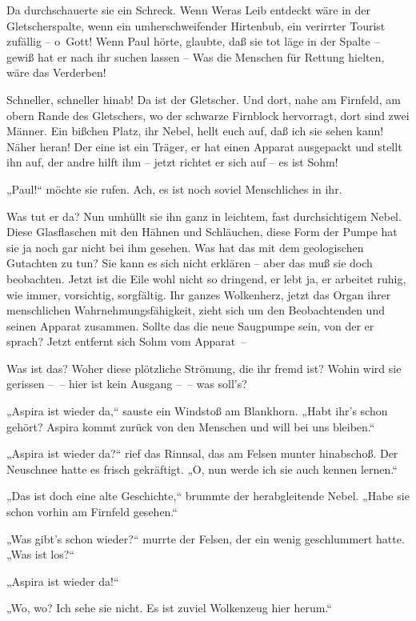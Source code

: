 Da durchschauerte sie ein Schreck. Wenn Weras Leib entdeckt wäre in
der Gletscherspalte, wenn ein umherschweifender Hirtenbub, ein
verirrter Tourist zufällig – o~Gott! Wenn Paul hörte, glaubte, daß
sie tot läge in der Spalte – gewiß hat er nach ihr suchen lassen –
Was die Menschen für Rettung hielten, wäre das Verderben!

Schneller, schneller hinab! Da ist der Gletscher. Und dort, nahe am
Firnfeld, am obern Rande des Gletschers, wo der schwarze Firnblock
hervorragt, dort sind zwei Männer. Ein bißchen Platz, ihr Nebel,
hellt euch auf, daß ich sie sehen kann! Näher heran! Der eine ist
ein Träger, er hat einen Apparat ausgepackt und stellt ihn auf, der
andre hilft ihm – jetzt richtet er sich auf – es ist Sohm!

„Paul!“ möchte sie rufen. Ach, es ist noch soviel Menschliches in
ihr.

Was tut er da? Nun umhüllt sie ihn ganz in leichtem, fast
durchsichtigem Nebel. Diese Glasflaschen mit den Hähnen und
Schläuchen, diese Form der Pumpe hat sie ja noch gar nicht bei ihm
gesehen. Was hat das mit dem geologischen Gutachten zu tun? Sie
kann es sich nicht erklären – aber das muß sie doch beobachten.
Jetzt ist die Eile wohl nicht so dringend, er lebt ja, er arbeitet
ruhig, wie immer, vorsichtig, sorgfältig. Ihr ganzes Wolkenherz,
jetzt das Organ ihrer menschlichen Wahrnehmungsfähigkeit, zieht
sich um den Beobachtenden und seinen Apparat zusammen. Sollte das
die neue Saugpumpe sein, von der er sprach? Jetzt entfernt sich
Sohm vom Apparat~–

Was ist das? Woher diese plötzliche Strömung, die ihr fremd ist?
Wohin wird sie gerissen –~– hier ist kein Ausgang –~– was soll's?

„Aspira ist wieder da,“ sauste ein Windstoß am Blankhorn. „Habt
ihr's schon gehört? Aspira kommt zurück von den Menschen und will
bei uns bleiben.“

„Aspira ist wieder da?“ rief das Rinnsal, das am Felsen munter
hinabschoß. Der Neuschnee hatte es frisch gekräftigt. „O, nun werde
ich sie auch kennen lernen.“

„Das ist doch eine alte Geschichte,“ brummte der herabgleitende
Nebel. „Habe sie schon vorhin am Firnfeld gesehen.“

„Was gibt's schon wieder?“ murrte der Felsen, der ein wenig
geschlummert hatte. „Was ist los?“

„Aspira ist wieder da!“

„Wo, wo? Ich sehe sie nicht. Es ist zuviel Wolkenzeug hier herum.“

